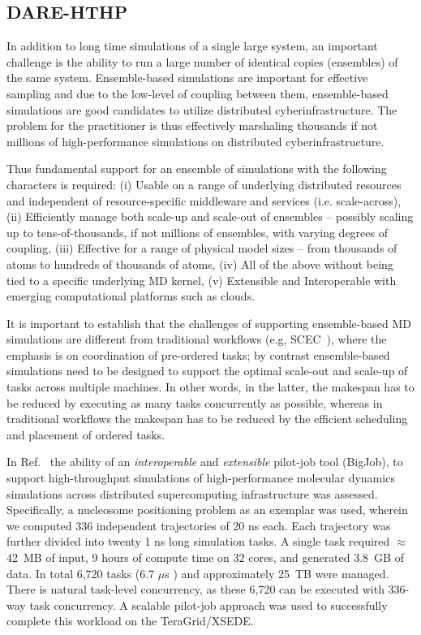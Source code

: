 \documentclass[]{svjour3}
\begin{document}
\subsection{DARE-HTHP}

In addition to long time simulations of a single large system, an
important challenge is the ability to run a large number of identical
copies (ensembles) of the same system. Ensemble-based simulations are
important for effective sampling and due to the low-level of coupling
between them, ensemble-based simulations are good candidates to
utilize distributed cyberinfrastructure. The problem for the
practitioner is thus effectively marshaling thousands if not millions
of high-performance simulations on distributed cyberinfrastructure.

Thus fundamental support for an ensemble of simulations with the
following characters is required: (i) Usable on a range of underlying
distributed resources and independent of resource-specific middleware
and services (i.e. scale-across), (ii) Efficiently manage both
scale-up and scale-out of ensembles -- possibly scaling up to
tens-of-thousands, if not millions of ensembles, with varying degrees
of coupling, (iii) Effective for a range of physical model sizes --
from thousands of atoms to hundreds of thousands of atoms, (iv) All of
the above without being tied to a specific underlying MD kernel, (v)
Extensible and Interoperable with emerging computational platforms
such as clouds.

It is important to establish that the challenges of supporting
ensemble-based MD simulations are different from traditional workflows
(e.g, SCEC~\cite{scec-sc10}), where the emphasis is on coordination of
pre-ordered tasks; by contrast ensemble-based simulations need to be
designed to support the optimal scale-out and scale-up of tasks across
multiple machines. In other words, in the latter, the makespan has to
be reduced by executing as many tasks concurrently as possible,
whereas in traditional workflows the makespan has to be reduced by the
efficient scheduling and placement of ordered tasks.

In Ref.~\cite{bigjob-ccgrid12} the ability of an {\it interoperable}
and {\it extensible} pilot-job tool (BigJob), to support
high-throughput simulations of high-performance molecular dynamics
simulations across distributed supercomputing infrastructure was
assessed. Specifically, a nucleosome positioning problem as an
exemplar was used, wherein we computed 336 independent trajectories of
20 ns each. Each trajectory was further divided into twenty 1 ns long
simulation tasks. A single task required $\approx$ 42~MB of input, 9
hours of compute time on 32 cores, and generated 3.8~GB of data. In
total 6,720 tasks (6.7 $ \mu $s ) and approximately 25~TB were
managed. There is natural task-level concurrency, as these 6,720 can
be executed with 336-way task concurrency. A scalable pilot-job
approach was used to successfully complete this workload on the
TeraGrid/XSEDE.
\end{document}
